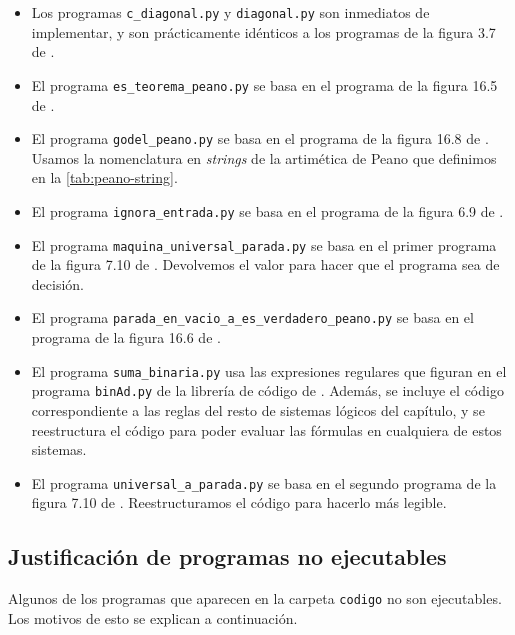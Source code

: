 \begin{itemize}
    \item Los programas \texttt{c\_diagonal.py} y \texttt{diagonal.py} son inmediatos de implementar, y son prácticamente idénticos a los programas de la figura 3.7 de \cite{MacCormick2018}.
    \item El programa \texttt{es\_teorema\_peano.py} se basa en el programa de la figura 16.5 de \cite{MacCormick2018}.
    \item El programa \texttt{godel\_peano.py} se basa en el programa de la figura 16.8 de \cite{MacCormick2018}. Usamos la nomenclatura en \emph{strings} de la artimética de Peano que definimos en la \cref{tab:peano-string}.
    \item El programa \texttt{ignora\_entrada.py} se basa en el programa de la figura 6.9 de \cite{MacCormick2018}.
    \item El programa \texttt{maquina\_universal\_parada.py} se basa en el primer programa de la figura 7.10 de \cite{MacCormick2018}. Devolvemos el valor  para hacer que el programa sea de decisión.
    \item El programa \texttt{parada\_en\_vacio\_a\_es\_verdadero\_peano.py} se basa en el programa de la figura 16.6 de \cite{MacCormick2018}.
    \item El programa \texttt{suma\_binaria.py} usa las expresiones regulares que figuran en el programa \texttt{binAd.py} de la librería de código de \cite{MacCormick2018}. Además, se incluye el código correspondiente a las reglas del resto de sistemas lógicos del capítulo, y se reestructura el código para poder evaluar las fórmulas en cualquiera de estos sistemas.
    \item El programa \texttt{universal\_a\_parada.py} se basa en el segundo programa de la figura 7.10 de \cite{MacCormick2018}. Reestructuramos el código para hacerlo más legible.
\end{itemize}

\subsection*{Justificación de programas no ejecutables}

Algunos de los programas que aparecen en la carpeta \texttt{codigo} no son ejecutables. Los motivos de esto se explican a continuación.

